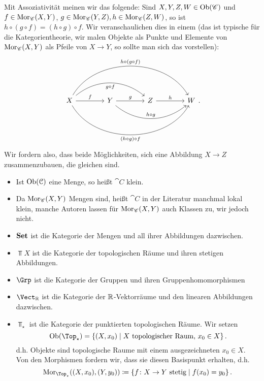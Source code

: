 \begin{remark*}
    Mit Assoziativität meinen wir das folgende: Sind $X,Y,Z,W\in \operatorname{Ob}(\mathscr{C})$ und $f\in \operatorname{Mor}_{\mathscr{C}}(X,Y)$, $g\in \operatorname{Mor}_{\mathscr{C}}(Y,Z), h\in \operatorname{Mor}_{\mathscr{C}}(Z,W)$, so ist $h \circ  (g \circ f) = (h \circ  g) \circ  f$. Wir veranschaulichen dies in einem  (das ist typische für die Kategorientheorie, wir malen Objekte als Punkte und Elemente von $\operatorname{Mor}_{\mathscr{C}}(X,Y)$ als Pfeile von $X\to Y$, so sollte man sich das vorstellen):
    \[
    \begin{tikzcd}[column sep = 4em, row sep = 4em]
        X \ar[bend left = 60]{rrr}{h \circ  (g \circ  f)} \ar[bend right = 60, swap]{rrr}{(h \circ  g) \circ f}\ar[bend left = 40,swap]{rr}{g \circ  f}\ar{r}{f} & Y\ar[bend right = 40]{rr}{h \circ  g} \ar{r}{g} & Z \ar{r}{h} & W
    \end{tikzcd}
    .\] 
    Wir fordern also, dass beide Möglichkeiten, sich eine Abbildung $X\to Z$ zusammenzubauen, die gleichen sind.
\end{remark*}

\begin{remark}
    \begin{itemize}
        \item Ist $\operatorname{Ob}(\mathcal{C})$ eine Menge, so heißt $\cat{C}$ klein.
        \item Da $\operatorname{Mor}_{\mathscr{C}}(X,Y)$ Mengen sind, heißt $\cat{C}$ in der Literatur manchmal lokal klein, manche Autoren lassen für $\operatorname{Mor}_{\mathscr{C}}(X,Y)$ auch Klassen zu, wir jedoch nicht.
    \end{itemize}
\end{remark}

\begin{example}
    \begin{itemize}
        \item $\operatorname{\textbf{Set}}$ ist die Kategorie der Mengen und all ihrer Abbildungen dazwischen.
        \item $\Top X$ ist die Kategorie der topologischen Räume und ihren stetigen Abbildungen.
        \item $\Grp$ ist die Kategorie der Gruppen und ihren Gruppenhomomorphismen
        \item  $\Vect_{\R}$ ist die Kategorie der $\mathbb{R}$-Vektorräume und den linearen Abbildungen dazwischen.
        \item $\Top_{\star}$ ist die Kategorie der punktierten topologischen Räume. Wir setzen
            \[
                \Ob(\Top_{\star}) = \left \{(X,x_0) \mid X \text{ topologischer Raum, } x_0\in X\right\} 
            .\] 
            d.h. Objekte sind topologische Raume mit einem ausgezeichneten  $x_0\in X$. Von den Morphismen fordern wir, dass sie diesen Basispunkt erhalten, d.h.
            \[
                \Mor_{\Top_{\star }}((X,x_0),(Y,y_0)) \coloneqq  \left \{f \colon X \to  Y \text{ stetig}\mid  f(x_0) = y_0\right\} 
            .\] 
    \end{itemize}
\end{example}

